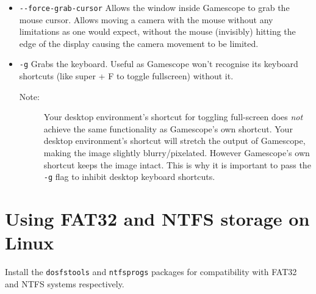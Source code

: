 \documentclass[a4paper]{article}
\begin{document}
\begin{itemize}
    \item \lstinline|--force-grab-cursor| Allows the window inside Gamescope to grab the mouse cursor. Allows moving a camera with the mouse without any limitations as one would expect, without the mouse (invisibly) hitting the edge of the display causing the camera movement to be limited.
    \item \lstinline|-g| Grabs the keyboard. Useful as Gamescope won't recognise its keyboard shortcuts (like super + F to toggle fullscreen) without it.
    \begin{description}
        \item[Note:] Your desktop environment's shortcut for toggling full-screen does \emph{not} achieve the same functionality as Gamescope's own shortcut. Your desktop environment's shortcut will stretch the output of Gamescope, making the image slightly blurry/pixelated. However Gamescope's own shortcut keeps the image intact. This is why it is important to pass the \lstinline|-g| flag to inhibit desktop keyboard shortcuts.
    \end{description}
\end{itemize}

\section{Using FAT32 and NTFS storage on Linux}

Install the \lstinline|dosfstools| and \lstinline|ntfsprogs| packages for compatibility with FAT32 and NTFS systems respectively.



\end{document}
